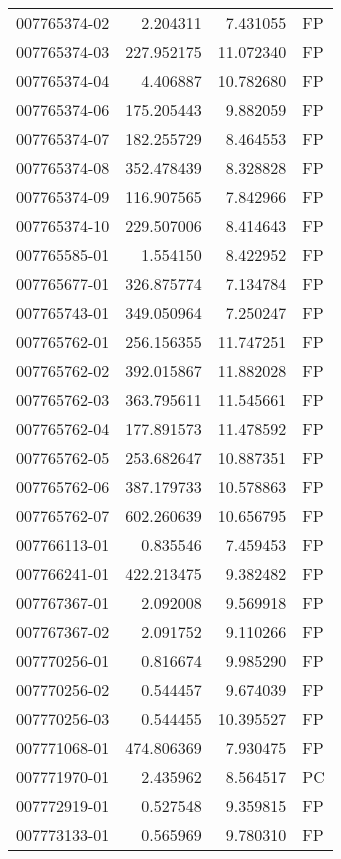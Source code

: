 \begin{tabular}{lrrl}
007765374-02 &    2.204311 &     7.431055 &   FP \\
007765374-03 &  227.952175 &    11.072340 &   FP \\
007765374-04 &    4.406887 &    10.782680 &   FP \\
007765374-06 &  175.205443 &     9.882059 &   FP \\
007765374-07 &  182.255729 &     8.464553 &   FP \\
007765374-08 &  352.478439 &     8.328828 &   FP \\
007765374-09 &  116.907565 &     7.842966 &   FP \\
007765374-10 &  229.507006 &     8.414643 &   FP \\
007765585-01 &    1.554150 &     8.422952 &   FP \\
007765677-01 &  326.875774 &     7.134784 &   FP \\
007765743-01 &  349.050964 &     7.250247 &   FP \\
007765762-01 &  256.156355 &    11.747251 &   FP \\
007765762-02 &  392.015867 &    11.882028 &   FP \\
007765762-03 &  363.795611 &    11.545661 &   FP \\
007765762-04 &  177.891573 &    11.478592 &   FP \\
007765762-05 &  253.682647 &    10.887351 &   FP \\
007765762-06 &  387.179733 &    10.578863 &   FP \\
007765762-07 &  602.260639 &    10.656795 &   FP \\
007766113-01 &    0.835546 &     7.459453 &   FP \\
007766241-01 &  422.213475 &     9.382482 &   FP \\
007767367-01 &    2.092008 &     9.569918 &   FP \\
007767367-02 &    2.091752 &     9.110266 &   FP \\
007770256-01 &    0.816674 &     9.985290 &   FP \\
007770256-02 &    0.544457 &     9.674039 &   FP \\
007770256-03 &    0.544455 &    10.395527 &   FP \\
007771068-01 &  474.806369 &     7.930475 &   FP \\
007771970-01 &    2.435962 &     8.564517 &   PC \\
007772919-01 &    0.527548 &     9.359815 &   FP \\
007773133-01 &    0.565969 &     9.780310 &   FP \\

\end{tabular}
